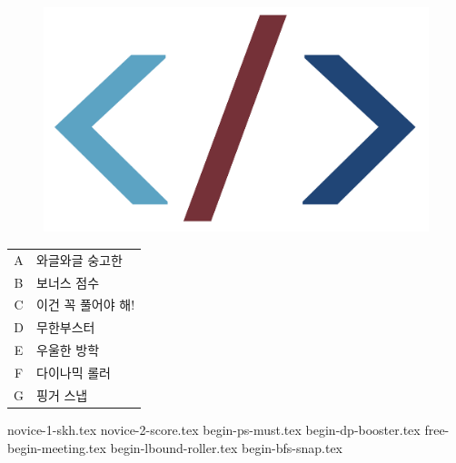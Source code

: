 \documentclass[11pt,a4paper,oneside,korean]{article}
\begin{document}
    
    \begin{titlepage}
        
    \end{titlepage}
    \begin{figure}[h]
        \centering
        \includegraphics[height=0.12\textheight]{./logo-cropped.png}
    \end{figure}
    \skhintro
    {
    
    \begin{table}[h]
    \sffamily\Large
    \renewcommand{\arraystretch}{1.2}
        \begin{tabular}{cl}
        A & 와글와글 숭고한 \\
        B & 보너스 점수 \\
        C & 이건 꼭 풀어야 해! \\
        D & 무한부스터 \\
        E & 우울한 방학 \\
        F & 다이나믹 롤러 \\
        G & 핑거 스냅 \\
        \end{tabular}
    \end{table}
    }

    \skhintroctd
    
    \newpage
    
    {novice-1-skh.tex}            %
    {novice-2-score.tex}          %
    {begin-ps-must.tex}           %
    {begin-dp-booster.tex}        %
    {free-begin-meeting.tex}      %
    {begin-lbound-roller.tex}     %
    {begin-bfs-snap.tex}          %
\end{document}
